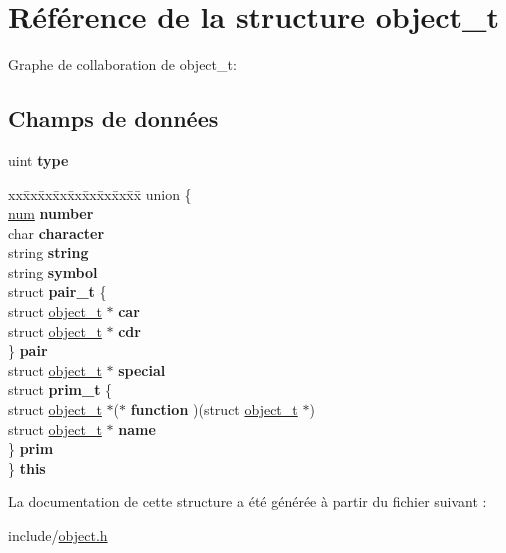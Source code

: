 \hypertarget{structobject__t}{}\section{Référence de la structure object\+\_\+t}
\label{structobject__t}


Graphe de collaboration de object\+\_\+t\+:
\subsection*{Champs de données}
\begin{DoxyCompactItemize}
\item 
\hypertarget{structobject__t_a92c5cda86022a69772cb8b6edba7530c}{}\label{structobject__t_a92c5cda86022a69772cb8b6edba7530c} 
uint {\bfseries type}
\item 
\hypertarget{structobject__t_ace8394a5a873527066c787412642bef1}{}\label{structobject__t_ace8394a5a873527066c787412642bef1} 
\begin{tabbing}
xx\=xx\=xx\=xx\=xx\=xx\=xx\=xx\=xx\=\kill
union \{\\
\>\hyperlink{structnum__t}{num} {\bfseries number}\\
\>char {\bfseries character}\\
\>string {\bfseries string}\\
\>string {\bfseries symbol}\\
\>struct {\bfseries pair\_t} \{\\
\>\>struct \hyperlink{structobject__t}{object\_t} $\ast$ {\bfseries car}\\
\>\>struct \hyperlink{structobject__t}{object\_t} $\ast$ {\bfseries cdr}\\
\>\} {\bfseries pair}\\
\>struct \hyperlink{structobject__t}{object\_t} $\ast$ {\bfseries special}\\
\>struct {\bfseries prim\_t} \{\\
\>\>struct \hyperlink{structobject__t}{object\_t} $\ast$($\ast$ {\bfseries function} )(struct \hyperlink{structobject__t}{object\_t} $\ast$)\\
\>\>struct \hyperlink{structobject__t}{object\_t} $\ast$ {\bfseries name}\\
\>\} {\bfseries prim}\\
\} {\bfseries this}\\

\end{tabbing}\end{DoxyCompactItemize}


La documentation de cette structure a été générée à partir du fichier suivant \+:\begin{DoxyCompactItemize}
\item 
include/\hyperlink{object_8h}{object.\+h}\end{DoxyCompactItemize}
